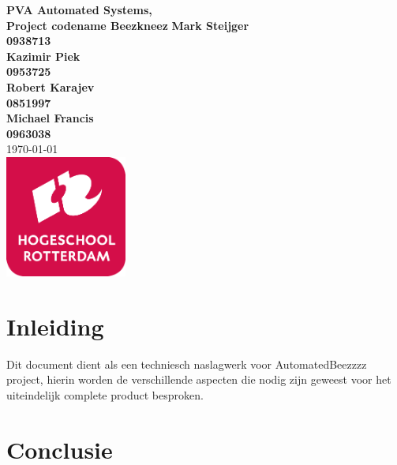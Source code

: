 \documentclass{article}
\begin{document}
\sffamily
\begin{titlepage}
  \centering
    \vfill
    {\bfseries\Huge
      PVA Automated Systems, \\
      Project codename Beezkneez
        \vskip2cm
      }
      {\bfseries\Large
        Mark Steijger\\
      }
      {
        \bfseries\normalsize
        0938713\\
            \vskip1cm
    }
          {\bfseries\Large
        Kazimir Piek\\
      }
      {
        \bfseries\normalsize
        0953725\\
            \vskip1cm
    }      {\bfseries\Large
        Robert Karajev\\
      }
      {
        \bfseries\normalsize
        0851997\\
            \vskip1cm
    }      {\bfseries\Large
        Michael Francis\\
      }
      {
        \bfseries\normalsize
        0963038\\
            \vskip1cm
    }
            \vskip1cm
        \today\\
    \vfill
    \includegraphics[width=4cm]{../IMAGES/logohr.png} %
    \vfill
    \vfill
\end{titlepage}
\newpage
\tableofcontents

\newpage
\section{Inleiding}
Dit document dient als een techniesch naslagwerk voor AutomatedBeezzzz project, hierin worden de verschillende aspecten
die nodig zijn geweest voor het uiteindelijk complete product besproken. \cite{akbari_mohammadi_ziarati_2010}



% 

% 




\section{Conclusie}


\newpage


\end{document}
